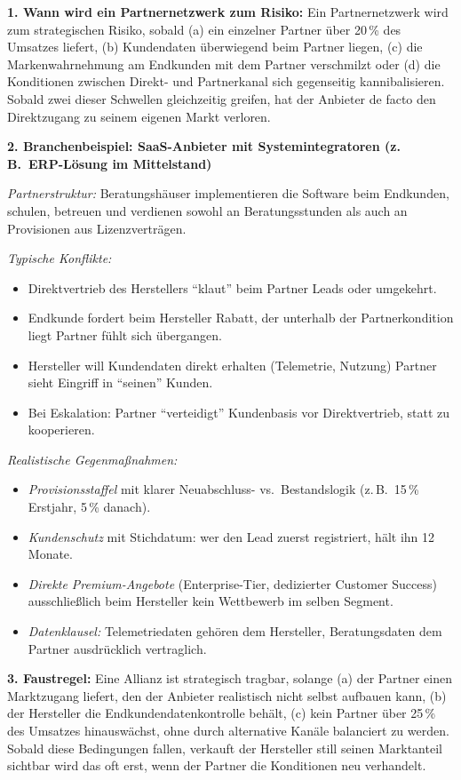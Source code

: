 \documentclass[11pt,a4paper,oneside]{article}
\begin{document}
\begin{loesungbox}
\textbf{1. Wann wird ein Partnernetzwerk zum Risiko:}
Ein Partnernetzwerk wird zum strategischen Risiko, sobald (a) ein einzelner Partner über 20\,\% des Umsatzes liefert, (b) Kundendaten überwiegend beim Partner liegen, (c) die Markenwahrnehmung am Endkunden mit dem Partner verschmilzt oder (d) die Konditionen zwischen Direkt- und Partnerkanal sich gegenseitig kannibalisieren. Sobald zwei dieser Schwellen gleichzeitig greifen, hat der Anbieter de facto den Direktzugang zu seinem eigenen Markt verloren.

\smallskip
\textbf{2. Branchenbeispiel: SaaS-Anbieter mit Systemintegratoren (z.\,B.\ ERP-Lösung im Mittelstand)}

\smallskip
\emph{Partnerstruktur:} Beratungshäuser implementieren die Software beim Endkunden, schulen, betreuen und verdienen sowohl an Beratungsstunden als auch an Provisionen aus Lizenzverträgen.

\smallskip
\emph{Typische Konflikte:}
\begin{itemize}
  \item Direktvertrieb des Herstellers ``klaut'' beim Partner Leads \textendash{} oder umgekehrt.
  \item Endkunde fordert beim Hersteller Rabatt, der unterhalb der Partnerkondition liegt \textendash{} Partner fühlt sich übergangen.
  \item Hersteller will Kundendaten direkt erhalten (Telemetrie, Nutzung) \textendash{} Partner sieht Eingriff in ``seinen'' Kunden.
  \item Bei Eskalation: Partner ``verteidigt'' Kundenbasis vor Direktvertrieb, statt zu kooperieren.
\end{itemize}

\smallskip
\emph{Realistische Gegenmaßnahmen:}
\begin{itemize}
  \item \emph{Provisionsstaffel} mit klarer Neuabschluss- vs.\ Bestandslogik (z.\,B.\ 15\,\% Erstjahr, 5\,\% danach).
  \item \emph{Kundenschutz} mit Stichdatum: wer den Lead zuerst registriert, hält ihn 12\,Monate.
  \item \emph{Direkte Premium-Angebote} (Enterprise-Tier, dedizierter Customer Success) ausschließlich beim Hersteller \textendash{} kein Wettbewerb im selben Segment.
  \item \emph{Datenklausel:} Telemetriedaten gehören dem Hersteller, Beratungsdaten dem Partner \textendash{} ausdrücklich vertraglich.
\end{itemize}

\smallskip
\textbf{3. Faustregel:}
Eine Allianz ist strategisch tragbar, solange (a) der Partner einen Marktzugang liefert, den der Anbieter realistisch nicht selbst aufbauen kann, (b) der Hersteller die Endkundendatenkontrolle behält, (c) kein Partner über 25\,\% des Umsatzes hinauswächst, ohne durch alternative Kanäle balanciert zu werden. Sobald diese Bedingungen fallen, verkauft der Hersteller still seinen Marktanteil \textendash{} sichtbar wird das oft erst, wenn der Partner die Konditionen neu verhandelt.
\end{loesungbox}
\end{document}
